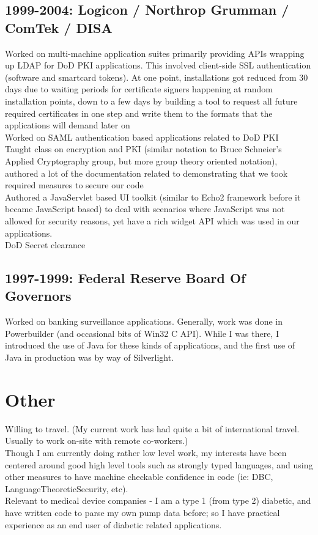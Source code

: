 \documentclass[margin]{res}
\begin{document}
\begin{resume}
\subsection{1999-2004: Logicon / Northrop Grumman / ComTek / DISA}
Worked on multi-machine application suites primarily providing APIs
wrapping up LDAP for DoD PKI applications.  This involved client-side
SSL authentication (software and smartcard tokens).  
At one point, installations got reduced from 30 days due to waiting periods
for certificate signers happening at random installation points, down to
a few days by building a tool to request all future required certificates in one step and write them to the formats that the applications will demand later on \\
Worked on SAML authentication based applications related to DoD PKI \\
Taught class on encryption and PKI (similar notation to Bruce Schneier's Applied Cryptography group, but more group theory oriented notation), authored a lot of the documentation related to demonstrating that we took required measures to secure our code \\
Authored a JavaServlet based UI toolkit (similar to Echo2 framework before it became JavaScript based) to deal with scenarios where JavaScript
was not allowed for security reasons, yet have a rich widget API which was used in our applications. \\
DoD Secret clearance

\subsection{1997-1999: Federal Reserve Board Of Governors}
Worked on banking surveillance applications.
Generally, work was done in Powerbuilder (and occasional bits of Win32 C API).
While I was there, I introduced the use of Java for these kinds of applications,
and the first use of Java in production was by way of Silverlight.
 
\section{Other}
Willing to travel.  (My current work has had quite a bit of international travel.  Usually to work on-site with remote co-workers.) \\
Though I am currently doing rather low level work, 
my interests have been centered around good high level tools
such as strongly typed languages, and using other measures
to have machine checkable confidence in code (ie: DBC, LanguageTheoreticSecurity, etc). \\
Relevant to medical device companies - I am a type 1 (from type 2) diabetic, and have written code to parse my own pump data before; so I have practical experience as an end user of diabetic related applications.
 
\end{resume}
\end{document}
